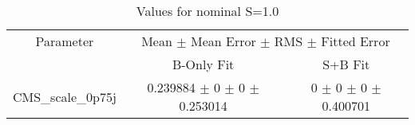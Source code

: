 \begin{table}
\centering
\caption{Values for nominal S=1.0}
\begin{tabular}{ccc}
\toprule
Parameter 	& \multicolumn{2}{c}{Mean $\pm$ Mean Error $\pm$ RMS $\pm$ Fitted Error}\\
 	& B-Only Fit & S+B Fit\\
\midrule
CMS\_scale\_0p75j 	& \num{0.239884} $\pm$ \num{0} $\pm$ \num{0} $\pm$ \num{0.253014} 	& \num{0} $\pm$ \num{0} $\pm$ \num{0} $\pm$ \num{0.400701}\\
\bottomrule
\end{tabular}
\end{table}